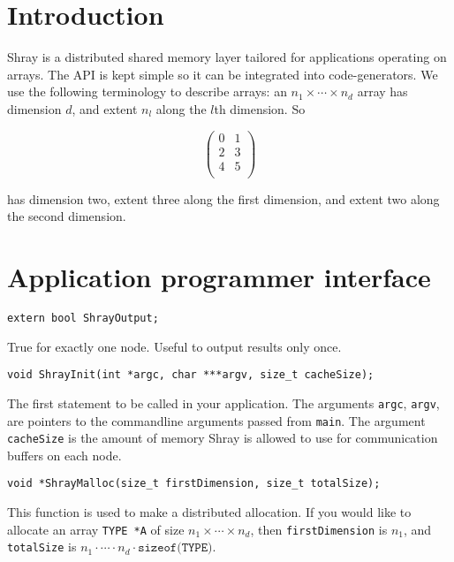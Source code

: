 \documentclass{article}
\begin{document}
\section*{Introduction}

Shray is a distributed shared memory layer tailored for applications operating on arrays.
The API is kept simple so it can be integrated into code-generators. We use the following 
terminology to describe arrays: an $n_1 \times \cdots \times n_d$ array has dimension $d$,
and extent $n_l$ along the $l$th dimension. So 

\[
\begin{pmatrix}
    0 & 1 \\
    2 & 3 \\
    4 & 5 \\
\end{pmatrix}
\]

has dimension two, extent three along the first dimension, and extent two along the second 
dimension. 

\section{Application programmer interface}

\begin{lstlisting}
extern bool ShrayOutput;
\end{lstlisting}

True for exactly one node. Useful to output results only once. 

\begin{lstlisting}
void ShrayInit(int *argc, char ***argv, size_t cacheSize);
\end{lstlisting}

The first statement to be called in your application. The arguments 
\texttt{argc}, \texttt{argv}, are pointers to the commandline arguments passed from 
\texttt{main}. The argument \texttt{cacheSize} is the amount of memory Shray is allowed to 
use for communication buffers on each node. 

\begin{lstlisting}
void *ShrayMalloc(size_t firstDimension, size_t totalSize);
\end{lstlisting}

This function is used to make a distributed allocation. If you would like to allocate an 
array \texttt{TYPE *A} of size $n_1 \times \cdots \times n_d$, then \texttt{firstDimension}
is $n_1$, and \texttt{totalSize} is $n_1 \cdot \cdots \cdot n_d \cdot \texttt{sizeof(TYPE)}$.
\end{document}
